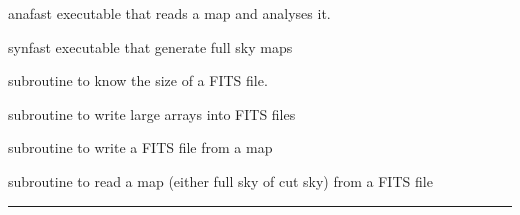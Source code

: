 \begin{related}
  \begin{sulist}{} %
  \item[anafast] executable that reads a \healpix map and analyses it. 
  \item[synfast] executable that generate full sky \healpix maps
  \item[\htmlref{getsize\_fits}{sub:getsize_fits}] subroutine to know the size of a FITS file.
  \item[\htmlref{write\_bintabh}{sub:write_bintabh}] subroutine to write large arrays into FITS files
  \item[\htmlref{output\_map}{sub:output_map}] subroutine to write a FITS file from a \healpix map
  \item[\htmlref{input\_map}{sub:input_map}] subroutine to read a \healpix map
  (either full sky of cut sky) from a FITS file
  \end{sulist}
\end{related}

\rule{\hsize}{2mm}

\newpage

